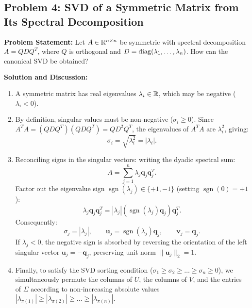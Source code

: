 \subsection{Problem 4: SVD of a Symmetric Matrix from Its Spectral Decomposition}
\label{sec:en:svd-symmetric-spectral}

\begin{example}
\textbf{Problem Statement:} Let $A \in \mathbb{R}^{n \times n}$ be symmetric with spectral decomposition $A = Q D Q^T$, where $Q$ is orthogonal and $D = \operatorname{diag}(\lambda_1, \dots, \lambda_n)$. How can the canonical SVD be obtained?

\medskip
\textbf{Solution and Discussion:}
\begin{enumerate}
    \item A symmetric matrix has real eigenvalues $\lambda_i \in \mathbb{R}$, which may be negative ($\lambda_i < 0$).
    \item By definition, singular values must be non-negative ($\sigma_i \ge 0$). Since $A^T A = (Q D Q^T)(Q D Q^T) = Q D^2 Q^T$, the eigenvalues of $A^T A$ are $\lambda_i^2$, giving:
    \begin{equation}
        \sigma_i = \sqrt{\lambda_i^2} = |\lambda_i|.
    \end{equation}
    \item Reconciling signs in the singular vectors: writing the dyadic spectral sum:
    \begin{equation}
        A = \sum_{j=1}^n \lambda_j \mathbf{q}_j \mathbf{q}_j^T.
    \end{equation}
    Factor out the eigenvalue sign $\operatorname{sgn}(\lambda_j) \in \{+1, -1\}$ (setting $\operatorname{sgn}(0) = +1$):
    \begin{equation}
        \lambda_j \mathbf{q}_j \mathbf{q}_j^T = |\lambda_j| \left( \operatorname{sgn}(\lambda_j) \mathbf{q}_j \right) \mathbf{q}_j^T.
    \end{equation}
    Consequently:
    \begin{equation}
        \sigma_j = |\lambda_j|, \qquad \mathbf{u}_j = \operatorname{sgn}(\lambda_j) \mathbf{q}_j, \qquad \mathbf{v}_j = \mathbf{q}_j.
    \end{equation}
    If $\lambda_j < 0$, the negative sign is absorbed by reversing the orientation of the left singular vector $\mathbf{u}_j = -\mathbf{q}_j$, preserving unit norm $\|\mathbf{u}_j\|_2 = 1$.
    \item Finally, to satisfy the SVD sorting condition ($\sigma_1 \ge \sigma_2 \ge \dots \ge \sigma_n \ge 0$), we simultaneously permute the columns of $U$, the columns of $V$, and the entries of $\Sigma$ according to non-increasing absolute values $|\lambda_{\pi(1)}| \ge |\lambda_{\pi(2)}| \ge \dots \ge |\lambda_{\pi(n)}|$.
\end{enumerate}
\end{example}

